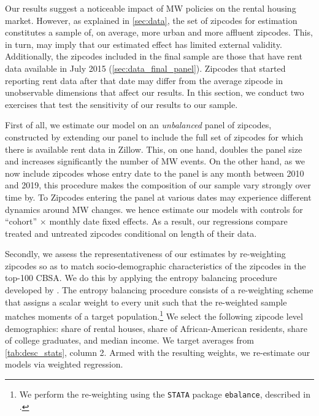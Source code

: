 Our results suggest a noticeable impact of MW policies on the rental housing market. However, as 
explained in \autoref{sec:data}, the set of zipcodes for estimation constitutes a sample of, on 
average, more urban and more affluent zipcodes. This, in turn, may imply that our estimated effect has 
limited external validity. Additionally, the zipcodes included in the final sample are those that 
have rent data available in July 2015 (\autoref{sec:data_final_panel}). Zipcodes that started reporting rent data after that 
date may differ from the average zipcode in unobservable dimensions that affect our results. 
In this section, we conduct two exercises that test the sensitivity of our results to our sample.

First of all, we estimate our model on an \textit{unbalanced} panel of zipcodes, constructed by 
extending our panel to include the full set of zipcodes for which there is available rent data in 
Zillow. This, on one hand, doubles the panel size and increases significantly the number of MW 
events. %
On the other hand, as we now include zipcodes whose entry date to the panel is any month between
2010 and 2019, this procedure makes the composition of our sample vary strongly over time by. To 
Zipcodes entering the panel at various dates may experience different dynamics around MW changes.  
we hence estimate our models with controls for ``cohort'' $\times$ monthly date fixed effects. 
As a result, our regressions compare treated and untreated zipcodes conditional on length of their 
data.

Secondly, we assess the representativeness of our estimates by re-weighting zipcodes so as to match 
socio-demographic characteristics of the zipcodes in the top-100 CBSA. We do this by applying the 
entropy balancing procedure developed by \cite{hainmueller2012entropy}. 
The entropy balancing procedure consists of a re-weighting scheme that assigns a scalar 
weight to every unit such that the re-weighted sample matches moments of a target population.\footnote{We 
	perform the re-weighting using the \texttt{STATA} package \texttt{ebalance}, described in 
	\textcite{hainmueller2013ebalance}.} We select the following zipcode 
level demographics: share of rental houses, share of African-American residents, share of college 
graduates, and median income. We target averages from \autoref{tab:desc_stats}, column 
2. Armed with the resulting weights, we re-estimate our models via weighted regression.

